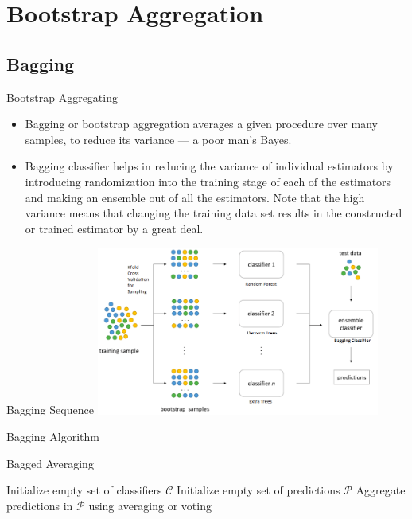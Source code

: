 \documentclass[11pt,aspectratio=1610,usenames,dvipsnames]{beamer} %
\begin{document}
\section{Bootstrap Aggregation}
\subsection{Bagging}
\begin{frame}{Bootstrap Aggregating}
	\begin{itemize}%
		\item Bagging or bootstrap aggregation averages a given procedure over many samples, to reduce its
		variance — a poor man's Bayes.
		\item Bagging classifier helps in reducing the variance of individual estimators by introducing randomization into the training stage of each of the estimators and making an ensemble out of all the estimators. Note that the high variance means that changing the training data set results in the constructed or trained estimator by a great deal.
	\end{itemize}
\end{frame}

\begin{frame}{Bagging Sequence}
	\includegraphics[width=0.70\textwidth]{figures/Bagging.png}
\end{frame}

\begin{frame}[fragile]{Bagging Algorithm}
	\begin{algorithm}[H]
		\small
	\SetAlgoLined
	\caption{Bagged Averaging}
	\BlankLine
	Initialize empty set of classifiers $\mathcal{C}$\;
	Initialize empty set of predictions $\mathcal{P}$\;
	\BlankLine
	\BlankLine
	Aggregate predictions in $\mathcal{P}$ using averaging or voting\;
	\;
	\end{algorithm}
\end{frame}
\end{document}
